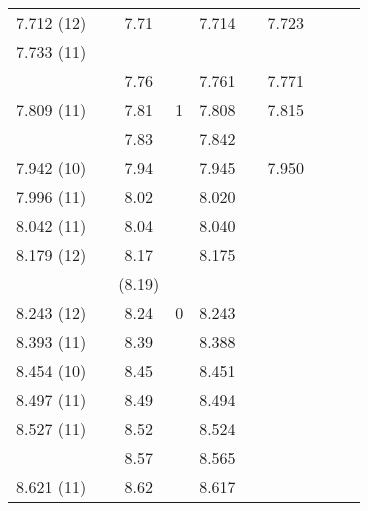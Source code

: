 \begin{landscape}
\begin{center}
\begin{longtable}{cc cc cc cc cc}
7.712 (12)      &              & 7.71     &         & 7.714      &                & 7.723 &          &          &      \\
7.733 (11)      &              &          &         &            &                &       &          &          &      \\
                &              & 7.76     &         & 7.761      &                & 7.771 &          &          &      \\
7.809 (11)      &              & 7.81     & 1       & 7.808      &                & 7.815 &          &          &      \\
                &              & 7.83     &         & 7.842      &                &       &          &          &      \\
7.942 (10)      &              & 7.94     &         & 7.945      &                & 7.950 &          &          &      \\
7.996 (11)      &              & 8.02     &         & 8.020      &                &       &          &          &      \\
8.042 (11)      &              & 8.04     &         & 8.040      &                &       &          &          &      \\
8.179 (12)      &              & 8.17     &         & 8.175      &                &       &          &          &      \\
                &              & (8.19)   &         &            &                &       &          &          &      \\
8.243 (12)      &              & 8.24     & 0       & 8.243      &                &       &          &          &      \\
8.393 (11)      &              & 8.39     &         & 8.388      &                &       &          &          &      \\
8.454 (10)      &              & 8.45     &         & 8.451      &                &       &          &          &      \\
8.497 (11)      &              & 8.49     &         & 8.494      &                &       &          &          &      \\
8.527 (11)      &              & 8.52     &         & 8.524      &                &       &          &          &      \\
                &              & 8.57     &         & 8.565      &                &       &          &          &      \\
8.621 (11)      &              & 8.62     &         & 8.617      &                &       &          &          &      \\

\end{longtable}
\end{center}
\end{landscape}
